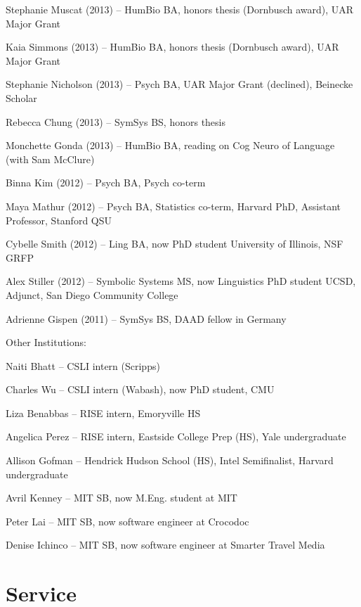 \documentclass{article}
\renewenvironment{itemize}{
\begin{list}{}{
  \setlength{\leftmargin}{1.5em}
  }
  }{
\end{list}
}
\begin{document}
\begin{itemize}
\begin{itemize}
    \item Stephanie Muscat (2013) -- HumBio BA, honors thesis (Dornbusch award), UAR Major Grant
    \item Kaia Simmons (2013) -- HumBio BA, honors thesis (Dornbusch award), UAR Major Grant
    \item Stephanie Nicholson (2013) -- Psych BA, UAR Major Grant (declined), Beinecke Scholar
    \item Rebecca Chung (2013) -- SymSys BS, honors thesis
    \item Monchette Gonda (2013) -- HumBio BA, reading on Cog Neuro of Language (with Sam McClure)
    \item Binna Kim (2012) -- Psych BA, Psych co-term
    \item Maya Mathur (2012) -- Psych BA, Statistics co-term, Harvard PhD, Assistant Professor, Stanford QSU
    \item Cybelle Smith (2012) -- Ling BA, now PhD student University of Illinois, NSF GRFP
    \item Alex Stiller (2012) -- Symbolic Systems MS, now Linguistics PhD student UCSD, Adjunct, San Diego Community College
    \item Adrienne Gispen (2011) -- SymSys BS, DAAD fellow in Germany
  \end{itemize}

  \item Other Institutions:
  \begin{itemize}
    \item Naiti Bhatt -- CSLI intern (Scripps)
    \item Charles Wu -- CSLI intern (Wabash), now PhD student, CMU
    \item Liza Benabbas -- RISE intern, Emoryville HS
    \item Angelica Perez -- RISE intern, Eastside College Prep (HS), Yale undergraduate
    \item Allison Gofman -- Hendrick Hudson School (HS), Intel Semifinalist, Harvard undergraduate
    \item Avril Kenney -- MIT SB, now M.Eng. student at MIT
    \item Peter Lai -- MIT SB, now software engineer at Crocodoc
    \item Denise Ichinco -- MIT SB, now software engineer at Smarter Travel Media
  \end{itemize}
\end{itemize}


\section*{Service}
\end{document}
